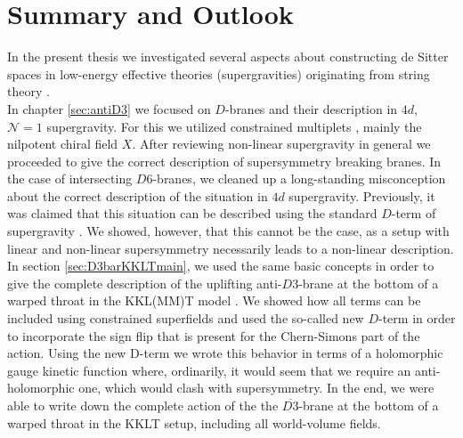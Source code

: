 \documentclass[a4paper,12pt]{report}
\begin{document}
\chapter{Summary and Outlook}
In the present thesis we investigated several aspects about constructing de Sitter spaces in low-energy effective theories (supergravities) originating from string theory \cite{Roupec:2018mbn,Banlaki:2018ayh,Andriot:2018mav,Cribiori:2019hod,Cribiori:2019bfx,Cribiori:2019drf,Cribiori:2019hrb,Cribiori:2020bgt}.\\
In chapter \ref{sec:antiD3} we focused on $D$-branes and their description in $4d$, $\mathcal{N}=1$ supergravity. For this we utilized constrained multiplets \cite{Rocek:1978nb,Lindstrom:1979kq,Samuel:1982uh,Komargodski:2009rz}, mainly the nilpotent chiral field $X$. After reviewing non-linear supergravity \cite{Farakos:2013ih,Dudas:2015eha,Bergshoeff:2015tra,Hasegawa:2015bza,Ferrara:2015gta,DallAgata:2016syy,Ferrara:2016een} in general we proceeded to give the correct description of supersymmetry breaking branes. In the case of intersecting $D6$-branes, we cleaned up a long-standing misconception about the correct description of the situation in $4d$ supergravity. Previously, it was claimed that this situation can be described using the standard $D$-term of supergravity \cite{Villadoro:2006ia,Blumenhagen:2002wn,Kachru:1999vj,Cvetic:2001nr}. We showed, however, that this cannot be the case, as a setup with linear and non-linear supersymmetry necessarily leads to a non-linear description. In section \ref{sec:D3barKKLTmain}, we used the same basic concepts in order to give the complete description of the uplifting anti-$D3$-brane at the bottom of a warped throat in the KKL(MM)T model \cite{Kachru:2003aw,Kachru:2003sx}. We showed \cite{GarciadelMoral:2017vnz,Cribiori:2019hod} how all terms can be included using constrained superfields and used the so-called new $D$-term \cite{Cribiori:2017laj,Cribiori:2018dlc,Cribiori:2018hxv} in order to incorporate the sign flip that is present for the Chern-Simons part of the action. Using the new D-term we wrote this behavior in terms of a holomorphic gauge kinetic function where, ordinarily, it would seem that we require an anti-holomorphic one, which would clash with supersymmetry. In the end, we were able to write down the complete action of the the $\overline{D3}$-brane at the bottom of a warped throat in the KKLT setup, including all world-volume fields.\\
\end{document}
